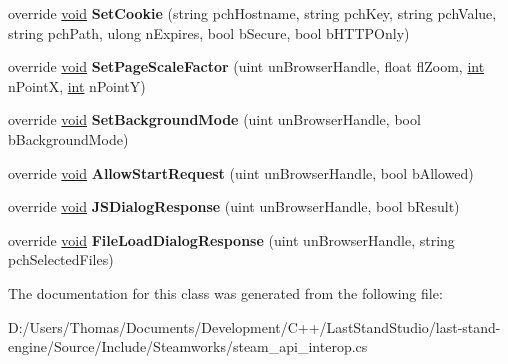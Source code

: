 \begin{DoxyCompactItemize}
\item 
\hypertarget{classValve_1_1Steamworks_1_1CSteamHTMLSurface_a5c7db138efca9f8a912ebd963cd0efd7}{}override \hyperlink{SDL__audio_8h_a52835ae37c4bb905b903cbaf5d04b05f}{void} {\bfseries Set\+Cookie} (string pch\+Hostname, string pch\+Key, string pch\+Value, string pch\+Path, ulong n\+Expires, bool b\+Secure, bool b\+H\+T\+T\+P\+Only)\label{classValve_1_1Steamworks_1_1CSteamHTMLSurface_a5c7db138efca9f8a912ebd963cd0efd7}

\item 
\hypertarget{classValve_1_1Steamworks_1_1CSteamHTMLSurface_ad878f45d92dc51ce04fa3f447a4c0383}{}override \hyperlink{SDL__audio_8h_a52835ae37c4bb905b903cbaf5d04b05f}{void} {\bfseries Set\+Page\+Scale\+Factor} (uint un\+Browser\+Handle, float fl\+Zoom, \hyperlink{SDL__thread_8h_a6a64f9be4433e4de6e2f2f548cf3c08e}{int} n\+Point\+X, \hyperlink{SDL__thread_8h_a6a64f9be4433e4de6e2f2f548cf3c08e}{int} n\+Point\+Y)\label{classValve_1_1Steamworks_1_1CSteamHTMLSurface_ad878f45d92dc51ce04fa3f447a4c0383}

\item 
\hypertarget{classValve_1_1Steamworks_1_1CSteamHTMLSurface_aaf2b58ad81ffd049b11b86ff2875245a}{}override \hyperlink{SDL__audio_8h_a52835ae37c4bb905b903cbaf5d04b05f}{void} {\bfseries Set\+Background\+Mode} (uint un\+Browser\+Handle, bool b\+Background\+Mode)\label{classValve_1_1Steamworks_1_1CSteamHTMLSurface_aaf2b58ad81ffd049b11b86ff2875245a}

\item 
\hypertarget{classValve_1_1Steamworks_1_1CSteamHTMLSurface_adf470822363986933e22e7ddab711fb3}{}override \hyperlink{SDL__audio_8h_a52835ae37c4bb905b903cbaf5d04b05f}{void} {\bfseries Allow\+Start\+Request} (uint un\+Browser\+Handle, bool b\+Allowed)\label{classValve_1_1Steamworks_1_1CSteamHTMLSurface_adf470822363986933e22e7ddab711fb3}

\item 
\hypertarget{classValve_1_1Steamworks_1_1CSteamHTMLSurface_a11edcaf2291814abf8972434c5213b61}{}override \hyperlink{SDL__audio_8h_a52835ae37c4bb905b903cbaf5d04b05f}{void} {\bfseries J\+S\+Dialog\+Response} (uint un\+Browser\+Handle, bool b\+Result)\label{classValve_1_1Steamworks_1_1CSteamHTMLSurface_a11edcaf2291814abf8972434c5213b61}

\item 
\hypertarget{classValve_1_1Steamworks_1_1CSteamHTMLSurface_a8626765673abad163c3365c2fda190e1}{}override \hyperlink{SDL__audio_8h_a52835ae37c4bb905b903cbaf5d04b05f}{void} {\bfseries File\+Load\+Dialog\+Response} (uint un\+Browser\+Handle, string pch\+Selected\+Files)\label{classValve_1_1Steamworks_1_1CSteamHTMLSurface_a8626765673abad163c3365c2fda190e1}

\end{DoxyCompactItemize}


The documentation for this class was generated from the following file\+:\begin{DoxyCompactItemize}
\item 
D\+:/\+Users/\+Thomas/\+Documents/\+Development/\+C++/\+Last\+Stand\+Studio/last-\/stand-\/engine/\+Source/\+Include/\+Steamworks/steam\+\_\+api\+\_\+interop.\+cs\end{DoxyCompactItemize}
